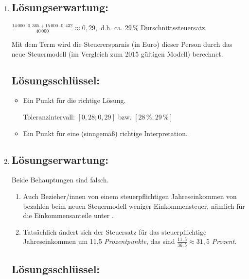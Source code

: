 \begin{langesbeispiel}
{\begin{enumerate}
\begin{itemize}
		Toleranzintervall: [; ] 
		\item Ein Punkt für die Angabe einer korrekten Formel für das Jahresnettoeinkommen. Äquivalente Formeln sind als richtig zu werten.
	\end{itemize}
	
	\item \subsection{Lösungserwartung:}
			
	$\frac{14\,000\cdot 0,365+15\,000\cdot 0,432}{40\,000}\approx 0,29,$ d.h. ca. $29\,\%$ Durschnittssteuersatz
	
	Mit dem Term wird die Steuerersparnis (in Euro) dieser Person durch das neue Steuermodell (im Vergleich zum 2015 gültigen Modell) berechnet.

	\subsection{Lösungsschlüssel:}
	
\begin{itemize}
	\item Ein Punkt für die richtige Lösung.
	
	Toleranzintervall: $[0,28;0,29]$ bzw. $[28\,\%; 29\,\%]$
	\item   Ein Punkt für eine (sinngemäß) richtige Interpretation.
\end{itemize}

\item \subsection{Lösungserwartung:}
			
Beide Behauptungen sind falsch.

\begin{enumerate}
	\item Auch  Bezieher/innen von einem steuerpflichtigen Jahreseinkommen von  bezahlen beim neuen Steuermodell weniger Einkommensteuer, nämlich für die Einkommensanteile unter . 
	\item Tatsächlich ändert sich der Steuersatz für das steuerpflichtige Jahreseinkommen um 11,5 \textit{Prozentpunkte}, das sind $\frac{11,5}{36,5}\approx 31,5$ \textit{Prozent}.
\end{enumerate}

	\subsection{Lösungsschlüssel:}
	

\end{enumerate}}
\end{langesbeispiel}
